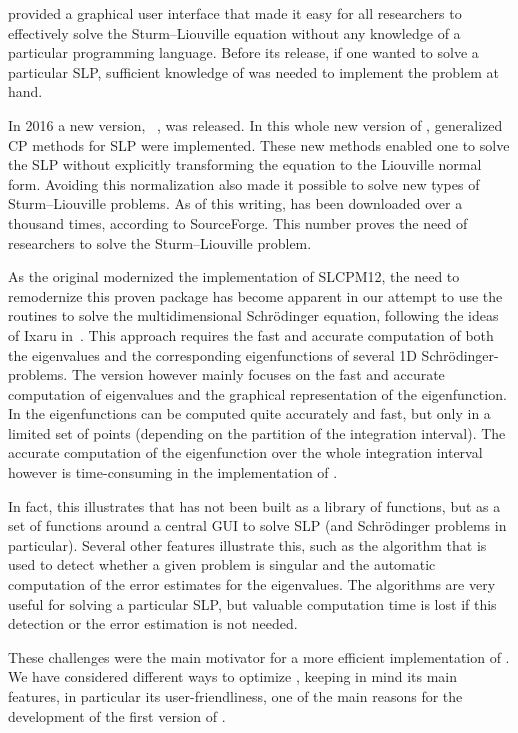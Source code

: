 \matslise{} provided a graphical user interface that made it easy for all researchers to effectively solve the Sturm--Liouville equation without any knowledge of a particular programming language. Before its release, if one wanted to solve a particular SLP, sufficient knowledge of \fortran{} was needed to implement the problem at hand.

In 2016 a new version, ~\cite{ledoux_matslise_2016}, was released. In this whole new version of \matslise{}, generalized CP methods for SLP were implemented. These new methods enabled one to solve the SLP without explicitly transforming the equation to the Liouville normal form. Avoiding this normalization also made it possible to solve new types of Sturm--Liouville problems. As of this writing,  has been downloaded over a thousand times, according to SourceForge. This number proves the need of researchers to solve the Sturm--Liouville problem.

As the original \matslise{} modernized the implementation of SLCPM12, the need to remodernize this proven package has become apparent in our attempt to use the \matslise{} routines to solve the multidimensional Schrödinger equation, following the ideas of Ixaru in~\cite{ixaru_new_2010}. This approach requires the fast and accurate computation of both the eigenvalues and the corresponding eigenfunctions of several 1D Schrödinger-problems. The  version however mainly focuses on the fast and accurate computation of eigenvalues and the graphical representation of the eigenfunction. In  the eigenfunctions can be computed quite accurately and fast, but only in a limited set of points (depending on the partition of the integration interval). The accurate computation of the eigenfunction over the whole integration interval however is time-consuming in the implementation of .

In fact, this illustrates that  has not been built as a library of functions, but as a set of functions around a central GUI to solve SLP (and Schrödinger problems in particular). Several other features illustrate this, such as the algorithm that is used to detect whether a given problem is singular and the automatic computation of the error estimates for the eigenvalues. The algorithms are very useful for solving a particular SLP, but valuable computation time is lost if this detection or the error estimation is not needed.

These challenges were the main motivator for a more efficient implementation of \matslise{}. We have considered different ways to optimize \matslise{}, keeping in mind its main features, in particular its user-friendliness, one of the main reasons for the development of the first version of \matslise{}.

